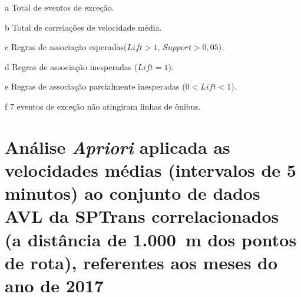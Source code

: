 \documentclass[
	12pt,				%
	oneside,			%
	a4paper,			%
	english,			%
	brazil				%
	]{abntex2ppgsi}
\begin{document}
{{\begin{apendicesenv}
\begin{table}[!htb]
\begin{threeparttable}
\begin{tablenotes}
            \item[a] Total de eventos de exceção.
            \item[b] Total de correlações de velocidade média.
            \item[c] Regras de associação esperadas($Lift > 1$, $Support > 0,05$).
            \item[d] Regras de associação inesperadas ($Lift = 1$).
            \item[e] Regras de associação parcialmente inesperadas ($0 < Lift < 1$).
            \item[f] 7 eventos de exceção não atingiram linhas de ônibus.
        \end{tablenotes}
\end{threeparttable}
\end{table}

\clearpage

\section{Análise \textit{Apriori} aplicada as velocidades médias (intervalos de 5 minutos) ao conjunto de dados AVL da SPTrans correlacionados (a distância de 1.000~m dos pontos de rota), referentes aos meses do ano de 2017}
\label{g4}



\end{apendicesenv}}}
\end{document}
